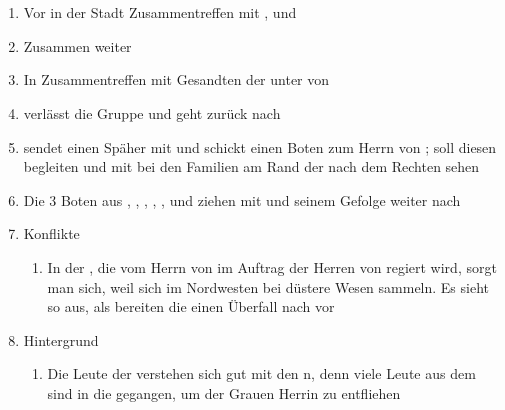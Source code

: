 \documentclass[12pt,a4paper,onecolumn,oneside,ngerman]{book}
\begin{document}
\chapter[Trennung auf Zeit]{}
\begin{enumerate}
  \item Vor {\Mundis} in der Stadt {\Blaufurt} Zusammentreffen mit {\Bomar}, {\Mena} und {\Umbra}
  \item Zusammen weiter
  \item In {\Mundis} Zusammentreffen mit Gesandten der {\Nordmark} unter {\Arn} von {\Ipes}
  \item {\Eno} verlässt die Gruppe und geht zurück nach {\Lobarn}
  \item {\Arn} sendet einen Späher mit {\Eno} und schickt einen Boten zum Herrn von {\Bornhold}; {\Nox} soll diesen begleiten und mit {\Enno} bei den {\Schattenlaufer} Familien am Rand der {\Nordmark} nach dem Rechten sehen
  \item Die 3 Boten aus {\Lobarn}, {\Dolo}, {\Tremor}, {\Umbra}, {\Sena}, {\Molitor} und {\Enna} ziehen mit {\Arn} und seinem Gefolge weiter nach {\Rhingell}
  \item Konflikte
  \begin{enumerate}
    \item In der {\Nordmark}, die vom Herrn von {\Bornhold} im Auftrag der Herren von {\Rhingell} regiert wird, sorgt man sich, weil sich im Nordwesten bei {\Eishold} düstere Wesen sammeln. Es sieht so aus, als bereiten die {\Eisleute} einen Überfall nach {\Rhingell} vor
  \end{enumerate}
  \item Hintergrund
  \begin{enumerate}
    \item Die Leute der {\Nordmark} verstehen sich gut mit den {\Schattenlaufer}n, denn viele Leute aus dem {\Enland} sind in die {\Nordmark} gegangen, um der Grauen Herrin zu entfliehen
  \end{enumerate}
\end{enumerate}
\end{document}
